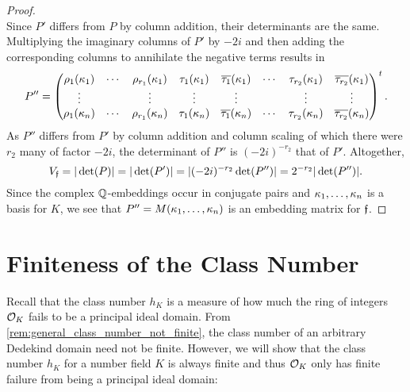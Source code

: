 \begin{proof}
\[      \]
      Since $P'$ differs from $P$ by column addition, their determinants are the same. Multiplying the imaginary columns of $P'$ by $-2i$ and then adding the corresponding columns to annihilate the negative terms results in
      \[
        P'' = \begin{pmatrix} \rho_{1}(\kappa_{1}) & \cdots & \rho_{r_{1}}(\kappa_{1}) & \tau_{1}(\kappa_{1}) &\overline{\tau_{1}}(\kappa_{1}) & \cdots & \tau_{r_{2}}(\kappa_{1}) & \overline{\tau_{r_{2}}}(\kappa_{1}) \\ \vdots & & \vdots & \vdots & \vdots & & \vdots & \vdots \\ \rho_{1}(\kappa_{n}) & \cdots & \rho_{r_{1}}(\kappa_{n}) & \tau_{1}(\kappa_{n}) & \overline{\tau_{1}}(\kappa_{n}) & \cdots & \tau_{r_{2}}(\kappa_{n}) & \overline{\tau_{r_{2}}}(\kappa_{n}) \end{pmatrix}^{t}.
      \]
      As $P''$ differs from $P'$ by column addition and column scaling of which there were $r_{2}$ many of factor $-2i$, the determinant of $P''$ is $(-2i)^{-r_{2}}$ that of $P'$. Altogether,
      \[
        V_{\mathfrak{f}} = |\det(P)| = |\det(P')| = |(-2i)^{-r_{2}}\det(P'')| = 2^{-r_{2}}|\det(P'')|.
      \]
      Since the complex $\mathbb{Q}$-embeddings occur in conjugate pairs and $\kappa_{1},\ldots,\kappa_{n}$ is a basis for $K$, we see that $P'' = M(\kappa_{1},\ldots,\kappa_{n})$ is an embedding matrix for $\mathfrak{f}$.
    \end{proof}
  \section{Finiteness of the Class Number}
    Recall that the class number $h_{K}$ is a measure of how much the ring of integers $\mathcal{O}_{K}$ fails to be a principal ideal domain. From \cref{rem:general_class_number_not_finite}, the class number of an arbitrary Dedekind domain need not be finite. However, we will show that the class number $h_{K}$ for a number field $K$ is always finite and thus $\mathcal{O}_{K}$ only has finite failure from being a principal ideal domain:

